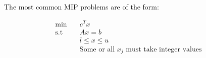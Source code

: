 \documentclass[../../thesis.tex]{subfiles}
\begin{document}
The most common MIP problems are of the form:

\begin{align}
  \textrm{min} \quad & c^Tx & \\ 
  \textrm{s.t} \quad & Ax = b & \\
   & l \leq x \leq u & \\
   & \text{Some or all $x_j$ must take integer values}
\end{align}
\end{document}
